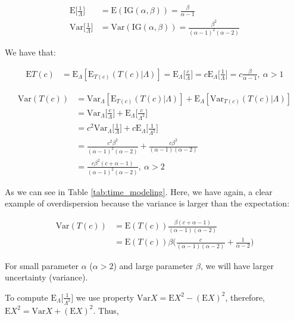 \begin{align*}
\textrm{E}\Bigg [\frac{1}{\Lambda}\Bigg ] &=\textrm{E}(\textrm{IG}(\alpha, \beta)) = \frac{\beta}{\alpha-1}\\
\textrm{Var}\Bigg [\frac{1}{\Lambda}\Bigg ] & =\textrm{Var}(\textrm{IG}(\alpha, \beta)) = \frac{\beta^2}{(\alpha-1)^2(\alpha-2)}
\end{align*}

We have that:

\begin{align*}
\textrm{E}T(c) &= \textrm{E}_{\Lambda}[\textrm{E}_{T(c)} (T(c)|\Lambda)] = \textrm{E}_{\Lambda}\Bigg [\frac{c}{\Lambda}\Bigg ] = c \textrm{E}_{\Lambda}\Bigg [\frac{1}{\Lambda}\Bigg ] = c\frac{\beta}{\alpha-1}, \ \alpha>1
\end{align*}


\begin{align*}
\textrm{Var}(T(c)) &= \textrm{Var}_{\Lambda}[\textrm{E}_{T(c)} (T(c)|\Lambda)] + \textrm{E}_{\Lambda}[\textrm{Var}_{T(c)}(T(c)|\Lambda)]\\
&=\textrm{Var}_{\Lambda}\Bigg [\frac{c}{\Lambda}\Bigg ] + \textrm{E}_{\Lambda}\Bigg [\frac{c}{\Lambda^2}\Bigg ] \\
&=c^2\textrm{Var}_{\Lambda}\Bigg [\frac{1}{\Lambda}\Bigg ] + c\textrm{E}_{\Lambda}\Bigg [\frac{1}{\Lambda^2}\Bigg ] \\
&=\frac{c^2\beta^2}{(\alpha-1)^2(\alpha-2)} + \frac{c\beta^2}{(\alpha-1)(\alpha-2)}\\
&=\frac{c\beta^2(c+\alpha-1)}{(\alpha-1)^2(\alpha-2)}, \ \alpha>2
\end{align*}

As we can see in Table \ref{tab:time_modeling}. Here, we have again, a clear example of overdispersion because the variance is larger than the expectation:

\begin{align*}
\textrm{Var}(T(c))&=\textrm{E}(T(c))\frac{\beta(c+\alpha-1)}{(\alpha-1)(\alpha-2)}\\
&=\textrm{E}(T(c))\beta\Bigg(\frac{c}{(\alpha-1)(\alpha-2)}+\frac{1}{\alpha-2}\Bigg)
\end{align*}

For small parameter $\alpha$ ($\alpha>2$) and large parameter $\beta$, we will have larger uncertainty (variance).

To compute $\textrm{E}_{\Lambda}\Bigg [\frac{1}{\Lambda^2}\Bigg ]$ we use property $\textrm{Var}X = \textrm{E}X^2-(\textrm{E}X)^2$, therefore, $\textrm{E}X^2 = \textrm{Var}X + (\textrm{E}X)^2$. Thus,

